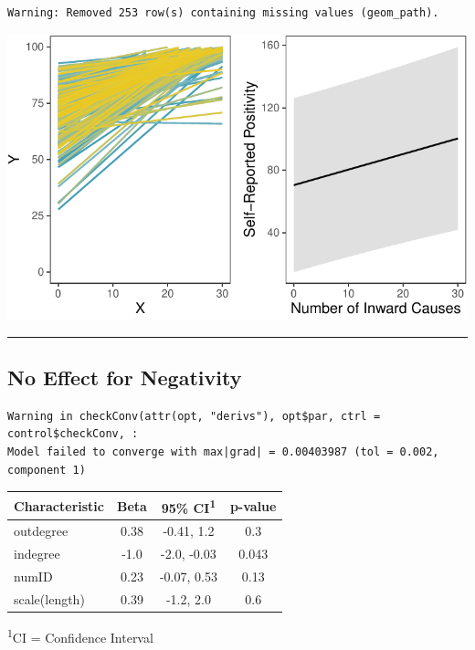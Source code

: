 \documentclass[
  .7em,
  letterpaper,
  DIV=11,
  numbers=noendperiod]{scrartcl}
\begin{document}
\begin{verbatim}
Warning: Removed 253 row(s) containing missing values (geom_path).
\end{verbatim}

\includegraphics{EpMemNet_LabPres_htmldoc_files/figure-pdf/unnamed-chunk-8-1.pdf}

\begin{center}\rule{0.5\linewidth}{0.5pt}\end{center}

\hypertarget{no-effect-for-negativity}{%
\subsection{No Effect for Negativity}\label{no-effect-for-negativity}}

\begin{verbatim}
Warning in checkConv(attr(opt, "derivs"), opt$par, ctrl = control$checkConv, :
Model failed to converge with max|grad| = 0.00403987 (tol = 0.002, component 1)
\end{verbatim}

\captionsetup[table]{labelformat=empty,skip=1pt}
\setlength{\LTpost}{0mm}
\begin{longtable}{lccc}
\toprule
\textbf{Characteristic} & \textbf{Beta} & \textbf{95\% CI}\textsuperscript{1} & \textbf{p-value} \\ 
\midrule
outdegree & 0.38 & -0.41, 1.2 & 0.3 \\ 
indegree & -1.0 & -2.0, -0.03 & 0.043 \\ 
numID & 0.23 & -0.07, 0.53 & 0.13 \\ 
scale(length) & 0.39 & -1.2, 2.0 & 0.6 \\ 
\bottomrule
\end{longtable}
\begin{minipage}{\linewidth}
\textsuperscript{1}CI = Confidence Interval\\
\end{minipage}
\end{document}
